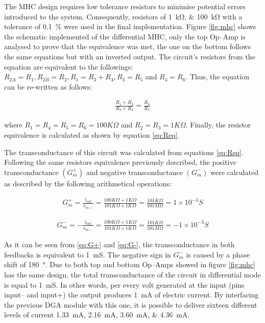 The MHC design requires low tolerance resistors to minimise potential errors introduced to the system. Consequently, resistors of \SIlist{1;100}{\kohm} with a tolerance of \SI{0.1}{\percent} were used in the final implementation. Figure \ref{fig:mhc} shows the schematic implemented of the differential MHC, only the top Op–Amp is analysed to prove that the equivalence was met, the one on the bottom follows the same equations but with an inverted output. The circuit’s resistors from the equation are equivalent to the followings: $R_{2A}=R_1, R_{2B}=R_2, R_1 = R_3 + R_4, R_3 = R_5$ and $R_4 = R_6$. Thus, the equation can be re-written as follows: 

\begin{align}
\label{eq:Req}
\frac{R_1 + R_2}{R_3 + R_4} = \frac{R_6}{R_5}
\end{align}

where $R_1=R_4=R_5=R_6=100K\Omega$ and $R_2=R_3=1K\Omega$. Finally, the resistor equivalence is calculated as shown by equation \ref{eq:Req}. 

The transconductance of this circuit was calculated from equations \ref{eq:Req}. Following the same resistors equivalence previously described, the positive  transconductance $(G^+_m)$ and negative transconductance $(G^-_m)$ were calculated as described by the following arithmetical operations:


\begin{align}
\label{eq:G+}
G^+_m=\frac{i_{out}}{v_{in+}}=\frac{100K\Omega + 1K\Omega}{101K\Omega \times 1K\Omega}=\frac{101K\Omega}{101M\Omega}=1\times10^{-3}S 
\end{align}

\begin{align}
\label{eq:G-}
G^-_m=-\frac{i_{out}}{v_{in-}}=\frac{100K\Omega + 1K\Omega}{101K\Omega \times 1K\Omega}=\frac{101K\Omega}{101M\Omega}=-1\times10^{-3}S 
\end{align}

As it can be seen from \ref{eq:G+} and \ref{eq:G-}, the transconductance in both feedbacks is equivalent to \SI{1}{\milli\siemens}. The negative sign in $G^{-}_m$ is caused by a phase shift of \SI{180}{\degree}. Due to both top and bottom Op–Amps showed in figure \ref{fig:mhc} has the same design, the total transconductance of the circuit in differential mode is equal to \SI{1}{\milli\siemens}. In other words, per every volt generated at the input (pins input– and input+) the output produces \SI{1}{\mA} of electric current. By interfacing the previous DGA module with this one, it is possible to deliver sixteen different levels of current \SIlist{1.33;2.16;3.60;4.36}{\mA}.

